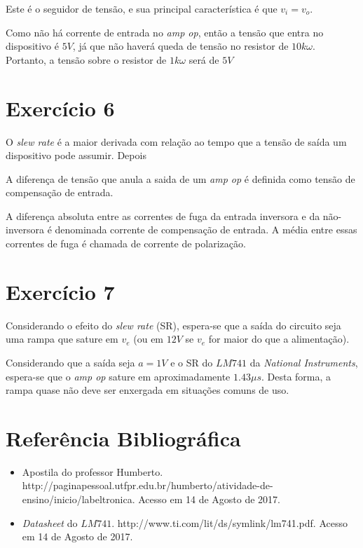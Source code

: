 \documentclass[12pt, a4paper, twoside]{article}
\begin{document}
Este é o seguidor de tensão, e sua principal característica é que $v_i = v_o$.

Como não há corrente de entrada no \textit{amp op}, então a tensão que entra no dispositivo é $5V$, já que não haverá queda de tensão no resistor de $10k\omega$. Portanto, a tensão sobre o resistor de $1k\omega$ será de $5V$

\section{Exercício 6}

O \textit{slew rate} é a maior derivada com relação ao tempo que a tensão de saída um dispositivo pode assumir. Depois

A diferença de tensão que anula a saida de um \textit{amp op} é definida como tensão de compensação de entrada.

A diferença absoluta entre as correntes de fuga da entrada inversora e da não-inversora é denominada corrente de compensação de entrada. A média entre essas correntes de fuga é chamada de corrente de polarização.

\section{Exercício 7}

Considerando o efeito do \textit{slew rate} (SR), espera-se que a saída do circuito seja uma rampa que sature em $v_e$ (ou em $12V$ se $v_e$ for maior do que a alimentação).

Considerando que a saída seja $a = 1V$ e o SR do $LM741$ da \textit{National Instruments}, espera-se que o \textit{amp op} sature em aproximadamente $1.43 \mu s$. Desta forma, a rampa quase não deve ser enxergada em situações comuns de uso.

\section{Referência Bibliográfica}

\begin{itemize}
    \item Apostila do professor Humberto. http://paginapessoal.utfpr.edu.br/humberto/atividade-de-ensino/inicio/labeltronica. Acesso em 14 de Agosto de 2017.
    \item \textit{Datasheet} do $LM741$. http://www.ti.com/lit/ds/symlink/lm741.pdf. Acesso em 14 de Agosto de 2017.
\end{itemize}
\end{document}
